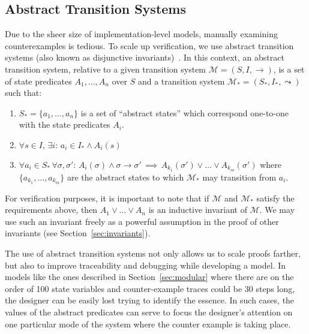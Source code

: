 \documentclass{llncs/llncs}
\newcommand{\tld}[1]{#1_{*}\xspace}
\begin{document}
\subsection{Abstract Transition Systems}\label{sec:abstract}

Due to the sheer size of implementation-level models, manually examining counterexamples is tedious. To scale up verification, we use abstract transition systems (also known as disjunctive invariants)~\cite{Rushby00:CAV,timed-systems}. In this context, an abstract transition system, relative to a given transition system $\mathcal{M} = (S, I, \rightarrow)$, is a set of state predicates $A_1, \ldots, A_n$ over $S$ and a transition system $\tld{\mathcal{M}} = (\tld{S}, \tld{I}, \leadsto)$ such that:

\begin{enumerate}
    \item $\tld{S} = \{a_1, \ldots, a_n\}$ is a set of ``abstract states'' which correspond one-to-one with the state predicates $A_i$.
    \item $\forall s \in I, \, \exists i : \, a_i \in \tld{I} \wedge A_i(s)$
    \item $\forall a_i \in \tld{S} \, \forall \sigma, \sigma' : \, A_i(\sigma) \wedge \sigma \rightarrow \sigma' \, \implies \, A_{k_1}(\sigma') \vee \ldots \vee A_{k_m}(\sigma')$ where $\{a_{k_1}, \ldots, a_{k_m}\}$ are the abstract states to which $\tld{\mathcal{M}}$ may transition from $a_i$.
\end{enumerate}

For verification purposes, it is important to note that if $\mathcal{M}$ and $\tld{\mathcal{M}}$ satisfy the requirements above, then $A_1 \vee \ldots \vee A_n$ is an inductive invariant of $\mathcal{M}$. We may use such an invariant freely as a powerful assumption in the proof of other invariants (see Section~\ref{sec:invariants}).

The use of abstract transition systems not only allows us to scale proofs farther, but also to improve traceability and debugging while developing a model. In models like the ones described in Section~\ref{sec:modular} where there are on the order of 100 state variables and counter-example traces could be 30 steps long, the designer can be easily lost trying to identify the essence. In such cases, the values of the abstract predicates can serve to focus the designer's attention on one particular mode of the system where the counter example is taking place.

\end{document}
